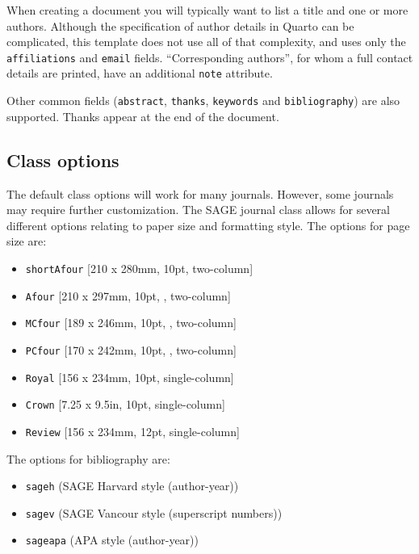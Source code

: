 \documentclass[
  Review,
  times,
  sageh]{sagej}
\providecommand{\tightlist}{%
  \setlength{\itemsep}{0pt}\setlength{\parskip}{0pt}}
\begin{document}
When creating a document you will typically want to list a title and one
or more authors. Although the specification of author details in Quarto
can be complicated, this template does not use all of that complexity,
and uses only the \texttt{affiliations} and \texttt{email} fields.
``Corresponding authors'', for whom a full contact details are printed,
have an additional \texttt{note} attribute.

Other common fields (\texttt{abstract}, \texttt{thanks},
\texttt{keywords} and \texttt{bibliography}) are also supported. Thanks
appear at the end of the document.

\hypertarget{class-options}{%
\subsection{Class options}\label{class-options}}

The default class options will work for many journals. However, some
journals may require further customization. The SAGE journal class
allows for several different options relating to paper size and
formatting style. The options for page size are:

\begin{itemize}
\tightlist
\item
  \texttt{shortAfour} {[}210 x 280mm, 10pt, two-column{]}
\item
  \texttt{Afour} {[}210 x 297mm, 10pt, , two-column{]}
\item
  \texttt{MCfour} {[}189 x 246mm, 10pt, , two-column{]}
\item
  \texttt{PCfour} {[}170 x 242mm, 10pt, , two-column{]}
\item
  \texttt{Royal} {[}156 x 234mm, 10pt, single-column{]}
\item
  \texttt{Crown} {[}7.25 x 9.5in, 10pt, single-column{]}
\item
  \texttt{Review} {[}156 x 234mm, 12pt, single-column{]}
\end{itemize}

The options for bibliography are:

\begin{itemize}
\tightlist
\item
  \texttt{sageh} (SAGE Harvard style (author-year))
\item
  \texttt{sagev} (SAGE Vancour style (superscript numbers))
\item
  \texttt{sageapa} (APA style (author-year))
\end{itemize}
\end{document}
